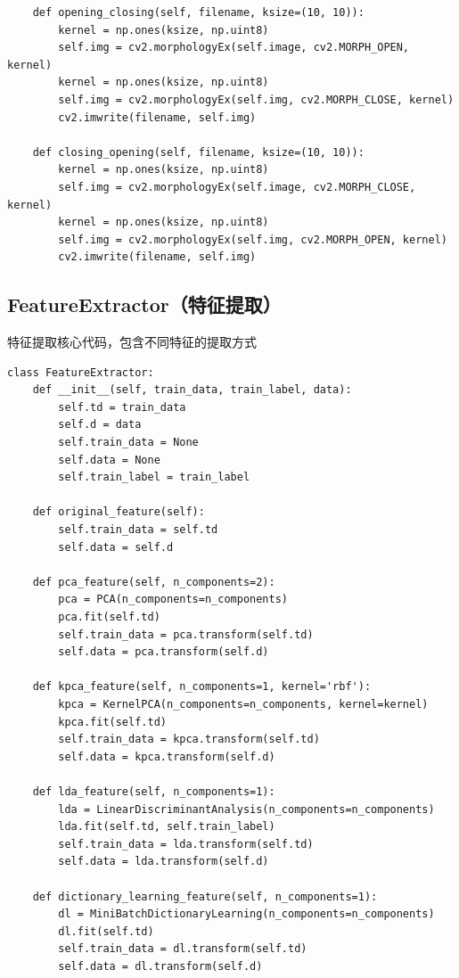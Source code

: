 \documentclass[12pt,hyperref,a4paper,UTF8]{ctexart}
\begin{document}
{{\begin{mdframed}[style=codebox]
\begin{lstlisting}
    def opening_closing(self, filename, ksize=(10, 10)):
        kernel = np.ones(ksize, np.uint8)
        self.img = cv2.morphologyEx(self.image, cv2.MORPH_OPEN, kernel)
        kernel = np.ones(ksize, np.uint8)
        self.img = cv2.morphologyEx(self.img, cv2.MORPH_CLOSE, kernel)
        cv2.imwrite(filename, self.img)

    def closing_opening(self, filename, ksize=(10, 10)):
        kernel = np.ones(ksize, np.uint8)
        self.img = cv2.morphologyEx(self.image, cv2.MORPH_CLOSE, kernel)
        kernel = np.ones(ksize, np.uint8)
        self.img = cv2.morphologyEx(self.img, cv2.MORPH_OPEN, kernel)
        cv2.imwrite(filename, self.img)
\end{lstlisting}
\end{mdframed}

\subsection{FeatureExtractor（特征提取）}
特征提取核心代码，包含不同特征的提取方式
\begin{mdframed}[style=codebox]
\begin{lstlisting}
class FeatureExtractor:
    def __init__(self, train_data, train_label, data):
        self.td = train_data
        self.d = data
        self.train_data = None
        self.data = None
        self.train_label = train_label

    def original_feature(self):
        self.train_data = self.td
        self.data = self.d

    def pca_feature(self, n_components=2):
        pca = PCA(n_components=n_components)
        pca.fit(self.td)
        self.train_data = pca.transform(self.td)
        self.data = pca.transform(self.d)

    def kpca_feature(self, n_components=1, kernel='rbf'):
        kpca = KernelPCA(n_components=n_components, kernel=kernel)
        kpca.fit(self.td)
        self.train_data = kpca.transform(self.td)
        self.data = kpca.transform(self.d)

    def lda_feature(self, n_components=1):
        lda = LinearDiscriminantAnalysis(n_components=n_components)
        lda.fit(self.td, self.train_label)
        self.train_data = lda.transform(self.td)
        self.data = lda.transform(self.d)

    def dictionary_learning_feature(self, n_components=1):
        dl = MiniBatchDictionaryLearning(n_components=n_components)
        dl.fit(self.td)
        self.train_data = dl.transform(self.td)
        self.data = dl.transform(self.d)
\end{lstlisting}
\end{mdframed}


}}
\end{document}
